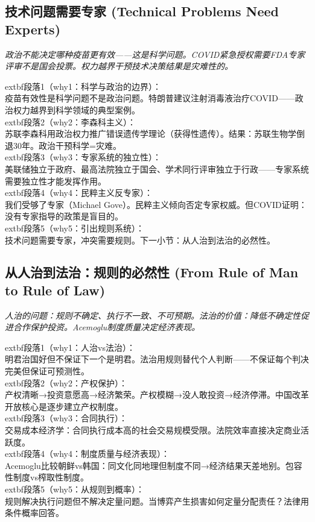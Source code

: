 \documentclass[a4paper,12pt]{book}
\newenvironment{motivation}{\begin{tcolorbox}[colback=gray!10,colframe=gray!60,title=\textit{本章动机 (Motivation)},fonttitle=\bfseries,arc=0mm,leftrule=3mm]\small\itshape}{\end{tcolorbox}}
\begin{document}
\begin{motivation}
\begin{motivation}
\begin{motivation}
	\subsection{技术问题需要专家 (Technical Problems Need Experts)}
	\begin{motivation}政治不能决定哪种疫苗更有效——这是科学问题。COVID紧急授权需要FDA专家评审不是国会投票。权力越界干预技术决策结果是灾难性的。\end{motivation}
		extbf{段落1（why1：科学与政治的边界）}：\\疫苗有效性是科学问题不是政治问题。特朗普建议注射消毒液治疗COVID——政治权力越界到科学领域的典型案例。\\	extbf{段落2（why2：李森科主义）}：\\苏联李森科用政治权力推广错误遗传学理论（获得性遗传）。结果：苏联生物学倒退30年。政治干预科学=灾难。\\	extbf{段落3（why3：专家系统的独立性）}：\\美联储独立于政府、最高法院独立于国会、学术同行评审独立于行政——专家系统需要独立性才能发挥作用。\\	extbf{段落4（why4：民粹主义反专家）}：\\我们受够了专家（Michael Gove）。民粹主义倾向否定专家权威。但COVID证明：没有专家指导的政策是盲目的。\\	extbf{段落5（why5：引出规则系统）}：\\技术问题需要专家，冲突需要规则。下一小节：从人治到法治的必然性。

	\subsection{从人治到法治：规则的必然性 (From Rule of Man to Rule of Law)}
	\begin{motivation}人治的问题：规则不确定、执行不一致、不可预期。法治的价值：降低不确定性促进合作保护投资。Acemoglu制度质量决定经济表现。\end{motivation}
		extbf{段落1（why1：人治vs法治）}：\\明君治国好但不保证下一个是明君。法治用规则替代个人判断——不保证每个判决完美但保证可预测性。\\	extbf{段落2（why2：产权保护）}：\\产权清晰→投资意愿高→经济繁荣。产权模糊→没人敢投资→经济停滞。中国改革开放核心是逐步建立产权制度。\\	extbf{段落3（why3：合同执行）}：\\交易成本经济学：合同执行成本高的社会交易规模受限。法院效率直接决定商业活跃度。\\	extbf{段落4（why4：制度质量与经济表现）}：\\Acemoglu比较朝鲜vs韩国：同文化同地理但制度不同→经济结果天差地别。包容性制度vs榨取性制度。\\	extbf{段落5（why5：从规则到概率）}：\\规则解决执行问题但不解决定量问题。当博弈产生损害如何定量分配责任？法律用条件概率回答。


\end{motivation}
\end{motivation}
\end{motivation}
\end{document}
